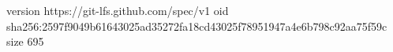 version https://git-lfs.github.com/spec/v1
oid sha256:2597f9049b61643025ad35272fa18cd43025f78951947a4e6b798c92aa75f59c
size 695
